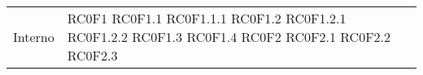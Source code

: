 \begin{center}
\begin{longtable}{|p{5cm}|p{5cm}|}
Interno & RC0F1 \newline RC0F1.1 \newline RC0F1.1.1 \newline RC0F1.2 \newline RC0F1.2.1 \newline RC0F1.2.2 \newline RC0F1.3 \newline RC0F1.4 \newline RC0F2 \newline RC0F2.1 \newline RC0F2.2 \newline RC0F2.3
\end{longtable}
\end{center}
